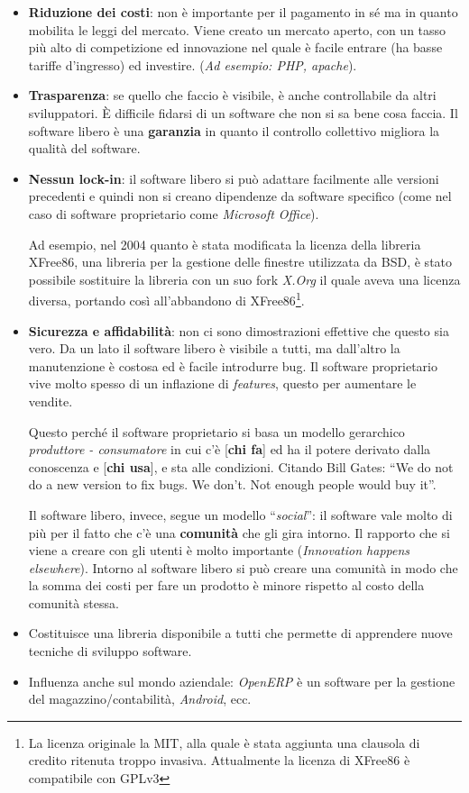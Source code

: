 \begin{itemize}
	\item \textbf{Riduzione dei costi}: non è importante per il pagamento in sé ma in quanto mobilita le leggi del mercato. Viene creato un mercato aperto, con un tasso più alto di competizione ed innovazione nel quale è facile entrare (ha basse tariffe d'ingresso) ed investire. (\textit{Ad esempio: PHP, apache}).
	\item \textbf{Trasparenza}: se quello che faccio è visibile, è anche controllabile da altri sviluppatori. È difficile fidarsi di un software che non si sa bene cosa faccia. Il software libero è una \textbf{garanzia} in quanto il controllo collettivo migliora la qualità del software.
	
	\item \textbf{Nessun lock-in}: il software libero si può adattare facilmente alle versioni precedenti e quindi non si creano dipendenze da software specifico (come nel caso di software proprietario come \textit{Microsoft Office}).
	
	Ad esempio, nel 2004 quanto è stata modificata la licenza della libreria XFree86, una libreria per la gestione delle finestre utilizzata da BSD, è stato possibile sostituire la libreria con un suo fork \textit{X.Org} il quale aveva una licenza diversa, portando così all'abbandono di XFree86\footnote{La licenza originale la MIT, alla quale è stata aggiunta una clausola di credito ritenuta troppo invasiva. Attualmente la licenza di XFree86 è compatibile con GPLv3}. 
	
	\item \textbf{Sicurezza e affidabilità}: non ci sono dimostrazioni effettive che questo sia vero. Da un lato il software libero è visibile a tutti, ma dall'altro la manutenzione è costosa ed è facile introdurre bug. Il software proprietario vive molto spesso di un inflazione di \textit{features}, questo per aumentare le vendite.
	
	Questo perché il software proprietario si basa un modello gerarchico \textit{produttore - consumatore} in cui c'è [\textbf{chi fa}] ed ha il potere derivato dalla conoscenza e [\textbf{chi usa}], e sta alle condizioni. Citando Bill Gates: ``We do not do a new version to fix bugs. We don't. Not enough people would buy it''. 
	
	Il software libero, invece, segue un modello ``\textit{social}'': il software vale molto di più per il fatto che c'è una \textbf{comunità} che gli gira intorno. Il rapporto che si viene a creare con gli utenti è molto importante (\textit{Innovation happens elsewhere}). Intorno al software libero si può creare una comunità in modo che la somma dei costi per fare un prodotto è minore rispetto al costo della comunità stessa.
	
	\item Costituisce una libreria disponibile a tutti che permette di apprendere nuove tecniche di sviluppo software.
	
	\item Influenza anche sul mondo aziendale: \textit{OpenERP} è un software per la gestione del magazzino/contabilità, \textit{Android}, ecc.
\end{itemize}

